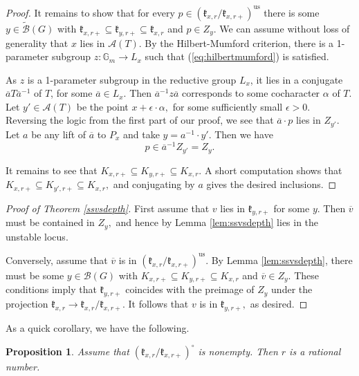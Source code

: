 \documentclass[12pt]{article}
\newcommand{\on}{\operatorname}
\newtheorem{proposition}[theorem]{Proposition}
\theoremstyle{remark}
\begin{document}
\begin{proof}
It remains to show that for every $p\in(\mathfrak{k}_{x,r}/\mathfrak{k}_{x,r+})^{\on{us}}$ there is some $y\in\widetilde{\mathcal{B}}(G)$ with $\mathfrak{k}_{x,r+}\subseteq \mathfrak{k}_{y,r+}\subseteq \mathfrak{k}_{x,r}$ and $p\in Z_y$. We can assume without loss of generality that $x$ lies in $\mathcal{A}(T)$. By the Hilbert-Mumford criterion, there is a 1-parameter subgroup $z:\mathbb{G}_m\rightarrow L_x$ such that (\ref{eq:hilbertmumford}) is satisfied.

As $z$ is a 1-parameter subgroup in the reductive group $L_x$, it lies in a conjugate $\overline{a}T\overline{a}^{-1}$ of $T$, for some $\overline{a}\in L_x$. Then $\overline{a}^{-1}z\overline{a}$ corresponds to some cocharacter $\alpha$ of $T.$ Let $y'\in\mathcal{A}(T)$ be the point $x+\epsilon\cdot\alpha,$ for some sufficiently small $\epsilon > 0.$ Reversing the logic from the first part of our proof, we see that $\overline{a}\cdot p$ lies in $Z_{y'}.$ Let $a$ be any lift of $\overline{a}$ to $P_x$ and take $y=a^{-1}\cdot y'.$ Then we have
\[
p\in\overline{a}^{-1}Z_{y'}=Z_{y}.
\]

It remains to see that $K_{x,r+}\subseteq K_{y,r+}\subseteq K_{x,r}.$ A short computation shows that $K_{x,r+}\subseteq K_{y',r+}\subseteq K_{x,r},$ and conjugating by $a$ gives the desired inclusions.
\end{proof}

\begin{proof}[Proof of Theorem \ref{ssvsdepth}]
    First assume that $v$ lies in $\mathfrak{k}_{y,r+}$ for some $y$. Then $\overline{v}$ must be contained in $Z_y,$ and hence by Lemma \ref{lem:ssvsdepth} lies in the unstable locus.

    Conversely, assume that $\overline{v}$ is in $(\mathfrak{k}_{x,r}/\mathfrak{k}_{x,r+})^{\on{us}}$. By Lemma \ref{lem:ssvsdepth}, there must be some $y\in\mathcal{B}(G)$ with $K_{x,r+}\subseteq K_{y,r+}\subseteq K_{x,r}$ and $\overline{v}\in Z_y$. These conditions imply that $\mathfrak{k}_{y,r+}$ coincides with the preimage of $Z_y$ under the projection $\mathfrak{k}_{x,r}\rightarrow\mathfrak{k}_{x,r}/\mathfrak{k}_{x,r+}.$ It follows that $v$ is in $\mathfrak{k}_{y,r+},$ as desired.
\end{proof}

As a quick corollary, we have the following.

\begin{proposition}\label{rationality}
Assume that $(\mathfrak{k}_{x,r}/\mathfrak{k}_{x,r+})^{\circ}$ is nonempty. Then $r$ is a rational number.
\end{proposition}
\end{document}
